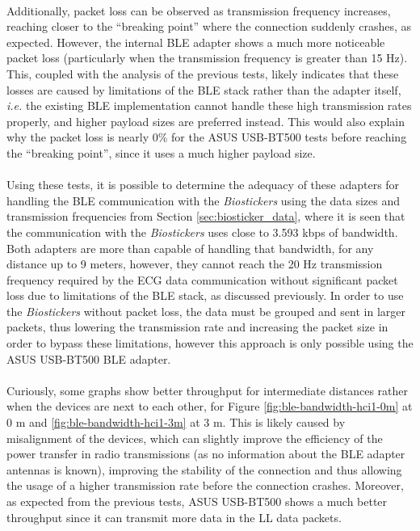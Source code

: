 \paragraph{} Additionally, packet loss can be observed as transmission frequency increases, reaching closer to the ``breaking point'' where the connection suddenly crashes, as expected. However, the internal \acs{BLE} adapter shows a much more noticeable packet loss (particularly when the transmission frequency is greater than 15 Hz). This, coupled with the analysis of the previous tests, likely indicates that these losses are caused by limitations of the \acs{BLE} stack rather than the adapter itself, \textit{i.e.} the existing \acs*{BLE} implementation cannot handle these high transmission rates properly, and higher payload sizes are preferred instead. This would also explain why the packet loss is nearly 0\% for the ASUS USB-BT500 tests before reaching the ``breaking point'', since it uses a much higher payload size.

\paragraph{} Using these tests, it is possible to determine the adequacy of these adapters for handling the \acs*{BLE} communication with the \textit{Biostickers} using the data sizes and transmission frequencies from Section \ref{sec:biosticker_data}, where it is seen that the communication with the \textit{Biostickers} uses close to 3.593 kbps of bandwidth. Both adapters are more than capable of handling that bandwidth, for any distance up to 9 meters, however, they cannot reach the 20 Hz transmission frequency required by the ECG data communication without significant packet loss due to limitations of the \acs{BLE} stack, as discussed previously. In order to use the \textit{Biostickers} without packet loss, the data must be grouped and sent in larger packets, thus lowering the transmission rate and increasing the packet size in order to bypass these limitations, however this approach is only possible using the ASUS USB-BT500 \acs{BLE} adapter. 

\paragraph{} Curiously, some graphs show better throughput for intermediate distances rather when the devices are next to each other,  for Figure \ref{fig:ble-bandwidth-hci1-0m} at 0 m and \ref{fig:ble-bandwidth-hci1-3m} at 3 m. This is likely caused by misalignment of the devices, which can slightly improve the efficiency of the power transfer in radio transmissions (as no information about the \acs{BLE} adapter antennas is known), improving the stability of the connection and thus allowing the usage of a higher transmission rate before the connection crashes. Moreover, as expected from the previous tests, ASUS USB-BT500 shows a much better throughput since it can transmit more data in the \acs{LL} data packets. 

